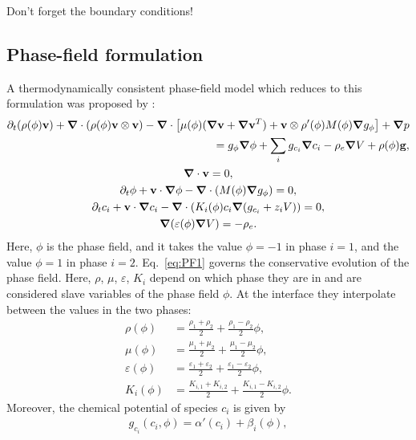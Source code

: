 \documentclass[preprint,pre,superscriptaddress,a4paper]{revtex4-1}
\renewcommand{\v}[1]{\ensuremath{\mathbf{#1}}} %
\newcommand{\gv}[1]{\ensuremath{\mbox{\boldmath$ #1 $}}}
\newcommand{\grad}[1]{\gv{\nabla} #1} %
\renewcommand{\div}[1]{\gv{\nabla} \cdot #1} %
\newcommand{\pdt}[1]{\partial_t #1}
\begin{document}
Don't forget the boundary conditions!

\subsection{Phase-field formulation}
A thermodynamically consistent phase-field model which reduces to this formulation was proposed by \cite{campillo-funollet2012}:
\begin{gather}
  \begin{split}
    \pdt (\rho (\phi) \v v) + \div \left( \rho(\phi) \v v \otimes \v v \right) - \div \left[ \mu (\phi) (\grad \v v + \grad \v v ^T) + \v v \otimes \rho'(\phi) M(\phi) \grad g_\phi \right] + \grad p\\
    = g_\phi \grad \phi + \sum_i g_{c_i} \grad c_i - \rho_e \grad V + \rho(\phi) \v g,
  \end{split} \label{eq:PF_NS1}\\
  \div \v v = 0, \\
  \pdt \phi + \v v \cdot \grad \phi - \div(M(\phi) \grad g_\phi ) = 0, \label{eq:PF1}\\
  \pdt c_i + \v v \cdot \grad c_i - \div ( K_i (\phi) c_i \grad (g_{c_i} + z_i V )) = 0, \\
  \grad ( \varepsilon (\phi) \grad V ) = - \rho_e.
\end{gather}
Here, $\phi$ is the phase field, and it takes the value $\phi=-1$ in phase $i=1$, and the value $\phi=1$ in phase $i=2$.
Eq.~\eqref{eq:PF1} governs the conservative evolution of the phase field.
Here, $\rho$, $\mu$, $\varepsilon$, $K_i$ depend on which phase they are in and are considered slave variables of the phase field $\phi$.
At the interface they interpolate between the values in the two phases:
\begin{align}
  \rho (\phi) &= \frac{\rho_1 + \rho_2}{2} + \frac{\rho_1 - \rho_2}{2} \phi, \\
  \mu (\phi ) &= \frac{\mu_1 + \mu_2}{2} + \frac{\mu_1 - \mu_2}{2} \phi, \\
  \varepsilon (\phi) &= \frac{\varepsilon_1 + \varepsilon_2}{2} + \frac{\varepsilon_1 - \varepsilon_2}{2} \phi, \\
  K_i (\phi) &= \frac{K_{i,1} + K_{i,2}}{2} + \frac{K_{i,1} - K_{i,2}}{2} \phi.
\end{align}
Moreover, the chemical potential of species $c_i$ is given by
\begin{align}
  g_{c_i}(c_i, \phi) = \alpha'(c_i) + \beta_i (\phi),
  \label{eq:PF_chempot}
\end{align}
\end{document}
